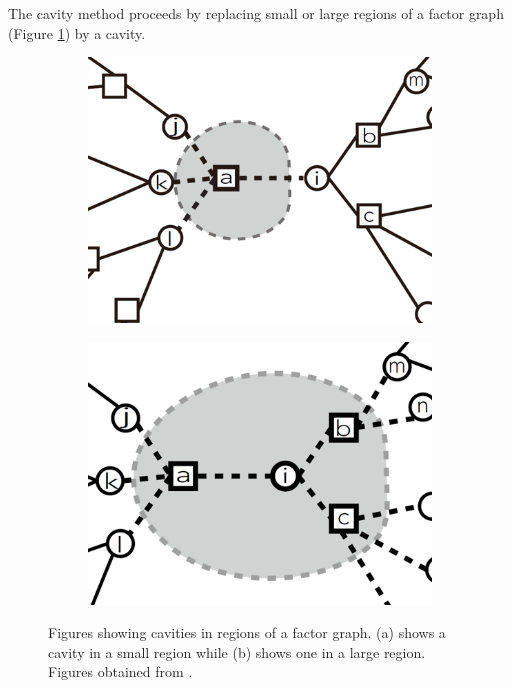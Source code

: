 \documentclass[%
 reprint,
 amsmath,amssymb,
 aps,
]{revtex4-2}
\begin{document}
The cavity method proceeds by replacing small or large regions of a factor graph (Figure \ref{fig:small_large_region}) by a cavity.
\begin{figure}[]
\begin{subfigure}{0.49\columnwidth}
\includegraphics[width=\linewidth]{cavity_method_small_region.png}
\subcaption{}
\end{subfigure}
\begin{subfigure}{0.49\columnwidth}
\includegraphics[width=\linewidth]{cavity_method_large_region.png}
\subcaption{}
\end{subfigure}
\caption{\label{fig:small_large_region} Figures showing cavities in regions of a factor graph. (a) shows a cavity in a small region while (b) shows one in a large region. Figures obtained from \cite{huang2021statistical_cavity}.}
\end{figure}
\end{document}

